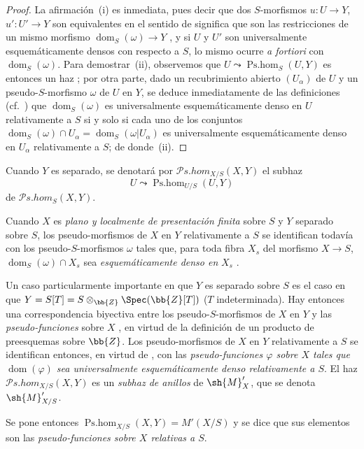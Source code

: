 \begin{proof}
La afirmación~(i) es inmediata, pues decir que dos $S$-morfismos $u:U\to Y$, $u':U'\to Y$ son equivalentes en el sentido de  significa que son las restricciones de un mismo morfismo $\operatorname{dom}_S(\omega)\to Y$ , y si $U$ y $U'$ son universalmente esquemáticamente densos con respecto a $S$, lo mismo ocurre \emph{a fortiori} con $\operatorname{dom}_S(\omega)$.
Para demostrar~(ii), observemos que $U\leadsto\operatorname{Ps.hom}_S(U,Y)$ es entonces un haz ; por otra parte, dado un recubrimiento abierto $(U_\alpha)$ de $U$ y un pseudo-$S$-morfismo $\omega$ de $U$ en $Y$, se deduce inmediatamente de las definiciones (cf.\ ) que $\operatorname{dom}_S(\omega)$ es universalmente esquemáticamente denso en $U$ relativamente a $S$ si y solo si cada uno de los conjuntos $\operatorname{dom}_S(\omega)\cap U_\alpha=\operatorname{dom}_S(\omega|U_\alpha)$ es universalmente esquemáticamente denso en $U_\alpha$ relativamente a $S$; de donde~(ii).
\end{proof}

Cuando $Y$ es separado, se denotará por $\mathscr{P}\!s.\mathit{hom}_{X/S}(X,Y)$ el subhaz
\[
  U\leadsto\operatorname{Ps.hom}_{U/S}(U,Y)
\]
de $\mathscr{P}\!s.\mathit{hom}_S(X,Y)$.

Cuando $X$ es \emph{plano y localmente de presentación finita} sobre $S$ y $Y$ separado sobre $S$, los pseudo-morfismos de $X$ en $Y$ relativamente a $S$ se identifican todavía con los pseudo-$S$-morfismos $\omega$ tales que, para toda fibra $X_s$ del morfismo $X\to S$, $\operatorname{dom}_S(\omega)\cap X_s$ sea \emph{esquemáticamente denso en} $X_s$ .

\begin{env}[20.5.4]
\label{IV.20.5.4}
Un caso particularmente importante en que $Y$ es separado sobre $S$ es el caso en que $Y=S[T]=S\otimes_{\bb{Z}}\Spec(\bb{Z}[T])$ ($T$ indeterminada).
Hay entonces una correspondencia biyectiva entre los pseudo-$S$-morfismos de $X$ en $Y$ y las \emph{pseudo-funciones} sobre $X$ , en virtud de la definición de un producto de preesquemas sobre $\bb{Z}$.
Los pseudo-morfismos de $X$ en $Y$ relativamente a $S$ se identifican entonces, en virtud de , con las \emph{pseudo-funciones $\varphi$ sobre $X$ tales que $\operatorname{dom}(\varphi)$ sea universalmente esquemáticamente denso relativamente a $S$}.
El haz $\mathscr{P}\!s.\mathit{hom}_{X/S}(X,Y)$ es un \emph{subhaz de anillos} de $\sh{M}'_X$, que se denota $\sh{M}'_{X/S}$.

Se pone entonces $\operatorname{Ps.hom}_{X/S}(X,Y)=M'(X/S)$ y se dice que sus elementos son las \emph{pseudo-funciones sobre $X$ relativas a $S$}.
\end{env}

